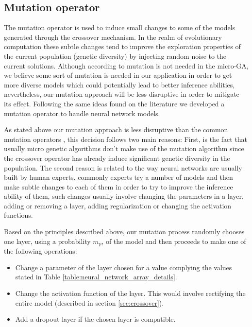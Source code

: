 \documentclass[journal]{IEEEtran}
\begin{document}
\subsection{Mutation operator}
\label{sec:mutation}

The mutation operator is used to induce small changes to some of the models generated through the crossover mechanism. In the realm of evolutionary computation these subtle changes tend to improve the exploration properties of the current population (genetic diversity) by injecting random noise to the current solutions.  Although according to \cite{Krishnakumar1989} mutation is not needed in the micro-GA, we believe some sort of mutation is needed in our application in order to get more diverse models which could potentially lead to better inference abilities, nevertheless, our mutation approach will be less disruptive in order to mitigate its effect. Following the same ideas found on the literature we developed a mutation operator to handle neural network models.

As stated above our mutation approach is less disruptive than the common mutation operators \cite{Engelbrecht2007}, this decision follows two main reasons: First, is the fact that usually micro genetic algorithms don't make use of the mutation algorithm since the crossover operator has already induce significant genetic diversity in the population. The second reason is related to the way neural networks are usually built by human experts, commonly experts try a number of models and then make subtle changes to each of them in order to try to improve the inference ability of them, such changes usually involve changing the parameters in a layer, adding or removing a layer, adding regularization or changing the activation functions. 

Based on the principles described above, our mutation process randomly chooses one layer, using a probability $m_p$, of the model and then proceeds to make one of the following operations:

\begin{itemize}
\item Change a parameter of the layer chosen for a value complying the values stated in Table \ref{table:neural_network_array_details}.
\item Change the activation function of the layer. This would involve rectifying the entire model (described in section \ref{sec:crossover}).
\item Add a dropout layer if the chosen layer is compatible.\\
\end{itemize} 
\end{document}
